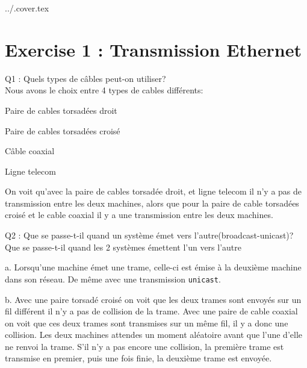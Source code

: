 \documentclass[11pt]{book}
\begin{document}
	

	 {../.cover.tex}

    \section{Exercise 1 : Transmission Ethernet}

        \begin{dent}{Q1 :} Quels types de câbles peut-on utiliser?\\
            Nous avons le choix entre 4 types de cables différents: 
            \begin{items}{-15pt}{-15pt}
                \item Paire de cables torsadées droit 
                \item Paire de cables torsadées croisé
                \item Câble coaxial
                \item Ligne telecom
            \end{items}
            On voit qu'avec la paire de cables torsadée droit, et ligne telecom il n'y a pas de transmission entre les deux machines, alors que pour la paire de cable torsadées croisé et le cable coaxial il y a une transmission entre les deux machines.
         \end{dent}

        \begin{dent}{Q2 :} Que se passe-t-il quand un système émet vers l'autre(broadcast-unicast)? Que se passe-t-il quand les 2 systèmes émettent l'un vers l'autre\\
            \begin{enum}{-15pt}{-15pt}
                \item[a.] Lorsqu'une machine émet une trame, celle-ci est émise à la deuxième machine dans son réseau. De même avec une transmission \texttt{unicast}.
                \item[b.] Avec une paire torsadé croisé on voit que les deux trames sont envoyés sur un fil différent il n'y a pas de collision de la trame. Avec une paire de cable coaxial on voit que ces deux trames sont transmises sur un même fil, il y a donc une collision. Les deux machines attendes un moment aléatoire avant que l'une d'elle ne renvoi la trame. S'il n'y a pas encore une collision, la première trame est transmise en premier, puis une fois finie, la deuxième trame est envoyée. 
            \end{enum}
         \end{dent}
\end{document}
